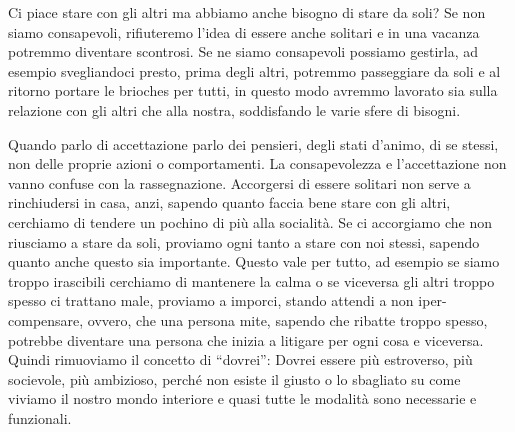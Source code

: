 \documentclass[12pt]{book} %
\begin{document}
\bigskip

Ci piace stare con gli altri ma abbiamo anche bisogno di stare da soli? Se non siamo consapevoli, rifiuteremo
l'idea di essere anche solitari e in una vacanza potremmo diventare scontrosi. Se ne siamo
consapevoli possiamo gestirla, ad esempio svegliandoci presto, prima degli altri, potremmo passeggiare da soli e al
ritorno portare le brioches per tutti, in questo modo avremmo lavorato sia sulla relazione con gli altri che alla
nostra, soddisfando le varie sfere di bisogni.


\bigskip

Quando parlo di accettazione parlo dei pensieri, degli stati d'animo, di se stessi, non delle
proprie azioni o comportamenti. La consapevolezza e l'accettazione non vanno confuse con la
rassegnazione. Accorgersi di essere solitari non serve a rinchiudersi in casa, anzi, sapendo quanto faccia bene stare
con gli altri, cerchiamo di tendere un pochino di più alla socialità. Se ci accorgiamo che non riusciamo a stare da
soli, proviamo ogni tanto a stare con noi stessi, sapendo quanto anche questo sia importante. Questo vale per tutto, ad
esempio se siamo troppo irascibili cerchiamo di mantenere la calma o se viceversa gli altri troppo spesso ci trattano
male, proviamo a imporci, stando attendi a non iper-compensare, ovvero, che una persona mite, sapendo che ribatte troppo
spesso, potrebbe diventare una persona che inizia a litigare per ogni cosa e viceversa. Quindi rimuoviamo il concetto
di “dovrei”: Dovrei essere più estroverso, più socievole, più ambizioso, perché non esiste il giusto o lo sbagliato su
come viviamo il nostro mondo interiore e quasi tutte le modalità sono necessarie e funzionali.


\bigskip
\end{document}
